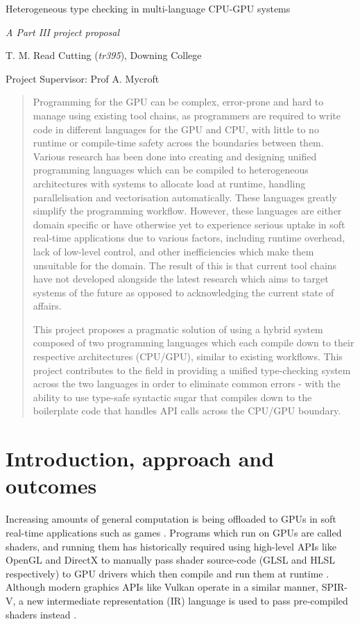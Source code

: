 \documentclass[11pt]{article}
\begin{document}
\centerline{\Large Heterogeneous type checking in multi-language CPU-GPU systems}
\vspace{2em}
\centerline{\Large \emph{A Part III project proposal}}
\vspace{2em}
\centerline{\large T. M. Read Cutting (\emph{tr395}), Downing College}
\vspace{1em}
\centerline{\large Project Supervisor: Prof A. Mycroft}
\vspace{1em}

\begin{abstract}

Programming for the GPU can be complex, error-prone and hard to manage using
existing tool chains, as programmers are required to write code in different
languages for the GPU and CPU, with little to no runtime or compile-time safety
across the boundaries between them. Various research has been done into
creating and designing unified programming languages which can be compiled to
heterogeneous architectures with systems to allocate load at runtime, handling
parallelisation and vectorisation automatically. These languages greatly
simplify the programming workflow. However, these languages are either domain
specific or have otherwise yet to experience serious uptake in soft real-time
applications due to various factors, including runtime overhead, lack of
low-level control, and other inefficiencies which make them unsuitable for the
domain. The result of this is that current tool chains have not developed
alongside the latest research which aims to target systems of the future as
opposed to acknowledging the current state of affairs.

This project proposes a pragmatic solution of using a hybrid system composed of
two programming languages which each compile down to their respective
architectures (CPU/GPU), similar to existing workflows. This project
contributes to the field in providing a unified type-checking system across the
two languages in order to eliminate common errors - with the ability to use
type-safe syntactic sugar that compiles down to the boilerplate code that
handles API calls across the CPU/GPU boundary.

\end{abstract}

\section{Introduction, approach and outcomes}

Increasing amounts of general computation is being offloaded to GPUs in soft
real-time applications such as games \cite{GPGPUTechniques2012}. Programs which
run on GPUs are called shaders, and running them has historically required
using high-level APIs like OpenGL and DirectX to manually pass shader
source-code (GLSL and HLSL respectively) to GPU drivers which then compile and
run them at runtime \cite{OpenGLWorkings} \cite{DirectXWorkings}. Although
modern graphics APIs like Vulkan \cite{Vulkan} operate in a similar manner,
SPIR-V, a new intermediate representation (IR) language is used to pass
pre-compiled shaders instead \cite{SPIR-V}.
\end{document}
